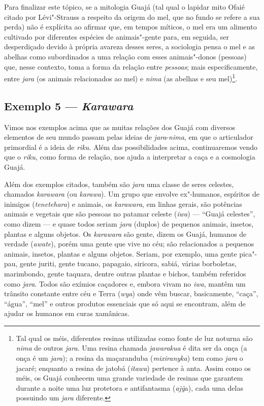 Para finalizar este tópico, se a mitologia Guajá (tal qual o lapidar
mito Ofaié citado por Lévi"-Strauss a respeito da origem do mel, que no
fundo se refere a sua perda) não é explícita ao afirmar que, em tempos
míticos, o mel era um alimento cultivado por diferentes espécies de
animais"-gente para, em seguida, ser desperdiçado devido à própria
avareza desses seres, a sociologia pensa o mel e as abelhas como
subordinados a uma relação com esses animais"-donos (pessoas) que, nesse
contexto, toma a forma da relação entre \emph{pessoas}; mais
especificamente, entre \emph{jara} (os animais relacionados ao mel) e
\emph{nima} (as abelhas e seu mel)\footnote{Tal qual os méis, diferentes
  resinas utilizadas como fonte de luz noturna são \emph{nima} de outros
  \emph{jara}. Uma resina chamada \emph{jawarakua} é dita ser da onça (a
  onça é um \emph{jara}); a resina da maçaranduba (\emph{mixiranyka})
  tem como \emph{jara} o jacaré; enquanto a resina de jatobá
  (\emph{itawa}) pertence à anta. Assim como os méis, os Guajá conhecem
  uma grande variedade de resinas que garantem durante a noite uma luz
  protetora e antifantasma (\emph{ajỹ}a), cada uma delas possuindo um
  \emph{jara} diferente.}.

\subsection{Exemplo 5 --- \emph{Karawara}}

\forceindent
Vimos nos exemplos acima que as muitas relações dos Guajá com diversos
elementos de seu mundo passam pelas ideias de \emph{jara}-\emph{nima},
em que o articulador primordial é a ideia de \emph{riku}. Além das
possibilidades acima, continuaremos vendo que o \emph{riku}, como forma
de relação, nos ajuda a interpretar a caça e a cosmologia Guajá.

Além dos exemplos citados, também são \emph{jara} uma classe de seres
celestes, chamados \emph{karawara} (ou \emph{karawa}). Um grupo que
envolve ex"-humanos, espíritos de inimigos (\emph{tenetehara}) e animais,
os \emph{karawara}, em linhas gerais, são potências animais e vegetais
que são pessoas no patamar celeste (\emph{iwa}) --- ``Guajá celestes'',
como dizem --- e quase todos seriam \emph{jara} (duplos) de pequenos
animais, insetos, plantas e alguns objetos. Os \emph{karawara} são
gente, dizem os Guajá, humanos de verdade (\emph{awate}), porém uma
gente que vive no céu; são relacionados a pequenos animais, insetos,
plantas e alguns objetos. Seriam, por exemplo, uma gente pica"-pau, gente
juriti, gente tucano, papagaio, siricora, sabiá, várias borboletas,
marimbondo, gente taquara, dentre outras plantas e bichos, também
referidos como \emph{jara}. Todos são exímios caçadores e, embora vivam
no \emph{iwa}, mantêm um trânsito constante entre céu e Terra
(\emph{wya}) onde vêm buscar, basicamente, ``caça'', ``água'', ``mel'' e
outros produtos essenciais que só aqui se encontram, além de ajudar os
humanos em curas xamânicas.


